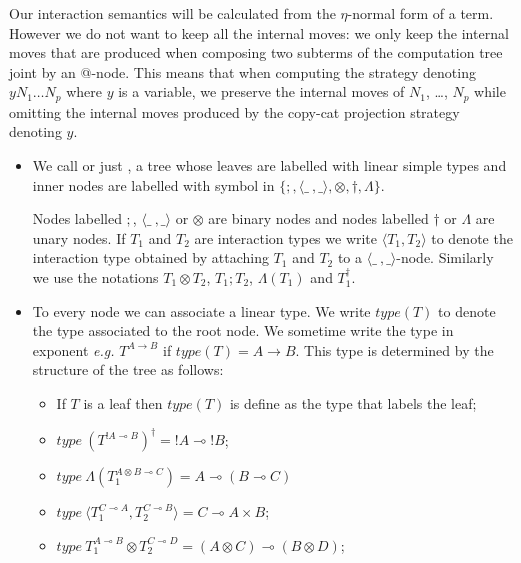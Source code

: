 Our interaction semantics will be calculated from the $\eta$-normal
form of a term. However we do not want to keep all the internal
moves: we only keep the internal moves that are produced when
composing two subterms of the computation tree joint by an @-node.
This means that when computing the strategy denoting $y N_1 \ldots
N_p$ where $y$ is a variable, we preserve the internal moves of
$N_1$, \ldots, $N_p$ while omitting the internal moves produced by
the copy-cat projection strategy denoting $y$.


\begin{definition} \hfill
\begin{itemize}
\item We call  or just ,
a tree whose leaves are labelled with linear simple types and
inner nodes are labelled with symbol in $\{ ;, \langle \_\ ,\_
\rangle, \otimes, \dagger, \Lambda \}$.


Nodes labelled $;$, $\langle \_\ ,\_ \rangle$ or $\otimes$ are
binary nodes and nodes labelled $\dagger$ or $\Lambda$ are unary
nodes. If $T_1$ and $T_2$ are interaction types we write
$\langle T_1, T_2 \rangle$ to denote the interaction type
obtained by attaching $T_1$ and $T_2$ to a $\langle \_\ ,\_
\rangle$-node. Similarly we use the notations $T_1 \otimes T_2$,
$T_1 ; T_2$, $\Lambda(T_1)$ and $T_1^\dagger$.

\item To every node we can associate a linear type. We write
    $type(T)$ to denote the type associated to the root node. We
    sometime write the type in exponent {\it e.g.}
    $T^{A\rightarrow B}$ if $type(T) =A\rightarrow B$. This type
    is determined by the structure of the tree as follows:
    \begin{itemize}
    \item If $T$ is a leaf then $type(T)$ is define as the type that labels the leaf;

    \item $type\ (T^{!A \multimap B})^\dagger = !A \multimap !B$;

    \item $type\ \Lambda(T_1^{A \otimes B \multimap C}) = A \multimap (B \multimap C)$

    \item $type\ \langle T_1^{C \multimap A} , T_2^{C \multimap B} \rangle =
    C \multimap A \times B$;

    \item $type\ T_1^{A \multimap B} \otimes T_2^{C \multimap D} = (A \otimes C) \multimap (B \otimes D)$;


\end{itemize}
\end{itemize}
\end{definition}
